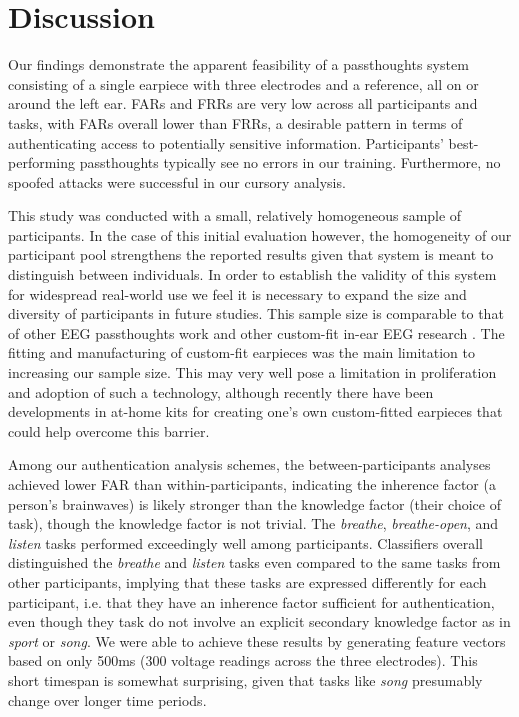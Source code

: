 \documentclass{sigchi}
\begin{document}
\section{Discussion}

Our findings demonstrate the apparent feasibility of a passthoughts system consisting of a single earpiece with three electrodes and a reference, all on or around the left ear. FARs and FRRs are very low across all participants and tasks, with FARs overall lower than FRRs, a desirable pattern in terms of authenticating access to potentially sensitive information. Participants' best-performing passthoughts typically see no errors in our training. Furthermore, no spoofed attacks were successful in our cursory analysis.

This study was conducted with a small, relatively homogeneous sample of participants. In the case of this initial evaluation however, the homogeneity of our participant pool strengthens the reported results given that system is meant to distinguish between individuals. In order to establish the validity of this system for widespread real-world use we feel it is necessary to expand the size and diversity of participants in future studies. This sample size is comparable to that of other EEG passthoughts work \cite{Ashby2011, Marcel2007a, Poulos2002, Chuang2013b, curran2016passthoughts} and other custom-fit in-ear EEG research \cite{Kidmose2013a, Mikkelsen2015}. The fitting and manufacturing of custom-fit earpieces was the main limitation to increasing our sample size. This may very well pose a limitation in proliferation and adoption of such a technology, although recently there have been developments in at-home kits for creating one's own custom-fitted earpieces \cite{voix2015settable} that could help overcome this barrier.

Among our authentication analysis schemes, the between-participants analyses achieved lower FAR than within-participants, indicating the inherence factor (a person's brainwaves) is likely stronger than the knowledge factor (their choice of task), though the knowledge factor is not trivial. The \textit{breathe}, \textit{breathe-open}, and \textit{listen} tasks performed exceedingly well among participants. Classifiers overall distinguished the \textit{breathe} and \textit{listen} tasks even compared to the same tasks from other participants, implying that these tasks are expressed differently for each participant, i.e. that they have an inherence factor sufficient for authentication, even though they task do not involve an explicit secondary knowledge factor as in \textit{sport} or \textit{song}. We were able to achieve these results by generating feature vectors based on only 500ms (300 voltage readings across the three electrodes). This short timespan is somewhat surprising, given that tasks like \textit{song} presumably change over longer time periods.
\end{document}
